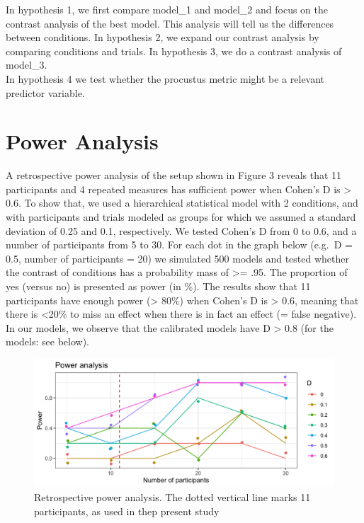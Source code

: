 \documentclass[
]{article}
\begin{document}
In hypothesis 1, we first compare model\_1 and model\_2 and focus on the
contrast analysis of the best model. This analysis will tell us the
differences between conditions. In hypothesis 2, we expand our contrast
analysis by comparing conditions and trials. In hypothesis 3, we do a
contrast analysis of model\_3.\\
In hypothesis 4 we test whether the procustus metric might be a relevant
predictor variable.

\hypertarget{power-analysis}{%
\section{Power Analysis}\label{power-analysis}}

A retrospective power analysis of the setup shown in Figure 3 reveals
that 11 participants and 4 repeated measures has sufficient power when
Cohen's D is \textgreater{} 0.6. To show that, we used a hierarchical
statistical model with 2 conditions, and with participants and trials
modeled as groups for which we assumed a standard deviation of 0.25 and
0.1, respectively. We tested Cohen's D from 0 to 0.6, and a number of
participants from 5 to 30. For each dot in the graph below (e.g.~D =
0.5, number of participants = 20) we simulated 500 models and tested
whether the contrast of conditions has a probability mass of
\textgreater= .95. The proportion of yes (versus no) is presented as
power (in \%). The results show that 11 participants have enough power
(\textgreater{} 80\%) when Cohen's D is \textgreater{} 0.6, meaning that
there is \textless20\% to miss an effect when there is in fact an effect
(= false negative). In our models, we observe that the calibrated models
have D \textgreater{} 0.8 (for the models: see below).

\begin{figure}
\centering
\includegraphics{FiguresPaper/PowerAnalysis03.png}
\caption{Retrospective power analysis. The dotted vertical line marks 11
participants, as used in thep present study}
\end{figure}
\end{document}
